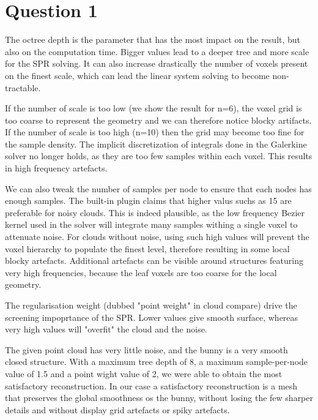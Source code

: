 \documentclass[a4paper]{article}
\begin{document}





\section*{Question 1}
The octree depth is the parameter that has the most impact on the result, but also on the
computation time. Bigger values lead to a deeper tree and more scale for the SPR solving.
It can also increase drastically the number of voxels present on the finest scale, which can
lead the linear system solving to become non-tractable.

If the number of scale is too low (we show the result for n=6), the voxel grid is too
coarse to represent the geometry and we can therefore notice blocky artifacts.
If the number of scale is too high (n=10) then the grid may become too fine for the sample
density. The implicit discretization of integrals done in the Galerkine solver no longer
holds, as they are too few samples within each voxel. This results in high frequency artefacts.

We can also tweak the number of samples per node to ensure that each nodes has enough samples.
The built-in plugin claims that higher valus suchs as 15 are preferable for noisy clouds.
This is indeed plausible, as the low frequency Bezier kernel used in the solver will integrate
many samples withing a single voxel to attenuate noise.
For clouds without noise, using such high values will prevent the voxel hierarchy to
populate the finest level, therefore resulting in some local blocky artefacts.
Additional artefacts can be visible around structures featuring very high frequencies,
because the leaf voxels are too coarse for the local geometry.

The regularisation weight (dubbed "point weight" in cloud compare) drive the screening
impoprtance of the SPR. Lower values give smooth surface, whereas very high values will
"overfit" the cloud and the noise. 


The given point cloud has very little noise, and the bunny is a very smooth closed structure.
With a maximum tree depth of 8, a maximum sample-per-node value of 1.5 and a point wight value
of 2, we were able to obtain the most satisfactory reconstruction. In our case a satisfactory
reconstruction is a mesh that preserves the global smoothness os the bunny, without losing
the few sharper details and without display grid artefacts or spiky artefacts.
\end{document}
